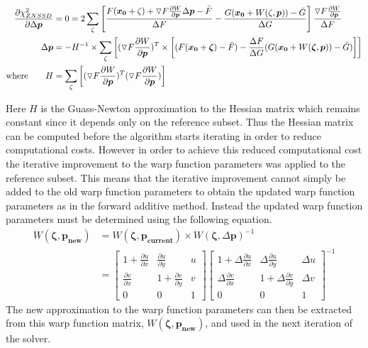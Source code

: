 \documentclass[[12pt,oneside,openany,a4paper, %
\newcommand*\mean[1]{\bar{#1}} %
\begin{document}
\begin{align}
  \frac{\partial \chi_{ZNSSD}^2}{\partial \Delta \bm{p}} &= 0 = 2 \sum_{\zeta}  \left[ \frac{F(\bm{x_0}+\zeta)+\triangledown F \frac{\partial W}{\partial \bm{p}} \Delta\bm{p}-\mean{F}}{\Delta F} -\frac{G(\bm{x_0}+W(\zeta,\bm{p}))-\mean{G}}{\Delta G}\right] \frac{\triangledown F \frac{\partial W}{\partial \bm{p}}}{\Delta F}\\
  \Delta \bm{p} &= - H^{-1} \times \sum_{\zeta} \left[ (\triangledown F \frac{\partial W}{\partial \bm{p}})^T \times \left[ (F(\bm{x_0} + \bm{\zeta}) - \mean{F}) - \frac{\Delta F}{\Delta G}(G(\bm{x_0}+W(\bm{\zeta}, \bm{p}))-\mean{G}) \right] \right]
  \label{eq:delta p} \\
  \text{where} \qquad H &= \sum_{\zeta} \left[ (\triangledown F \frac{\partial W}{\partial \bm{p}})^T (\triangledown F \frac{\partial W}{\partial \bm{p}}) \right]
\end{align}

Here $H$ is the Guass-Newton approximation to the Hessian matrix which remains constant since it depends only on the reference subset. Thus the Hessian matrix can be computed before the algorithm starts iterating in order to reduce computational costs. However in order to achieve this reduced computational cost the iterative improvement to the warp function parameters was applied to the reference subset. This means that the iterative improvement cannot simply be added to the old warp function parameters to obtain the updated warp function parameters as in the forward additive method. Instead the updated warp function parameters must be determined using the following equation.
\begin{align}
  W(\bm{\zeta},\bm{p_{new}})&=W(\bm{\zeta},\bm{p_{current}})\times W(\bm{\zeta},\Delta \bm{p})^{-1}\\
  &=\begin{bmatrix}
  1+\frac{\partial u}{\partial x} & \frac{\partial u}{\partial y} & u\\
  \frac{\partial v}{\partial x} & 1+\frac{\partial v}{\partial y} & v \\
  0 & 0 & 1
  \end{bmatrix}
  \begin{bmatrix}
  1+\Delta \frac{\partial u}{\partial x} & \Delta \frac{\partial u}{\partial y} & \Delta u\\
  \Delta \frac{\partial v}{\partial x} & 1+\Delta \frac{\partial v}{\partial y} & \Delta v \\
  0 & 0 & 1
  \end{bmatrix}^{-1}
  \label{eq:get new p}
\end{align}
The new approximation to the warp function parameters can then be extracted from this warp function matrix, $W(\bm{\zeta},\bm{p_{new}})$, and used in the next iteration of the solver.
\end{document}
